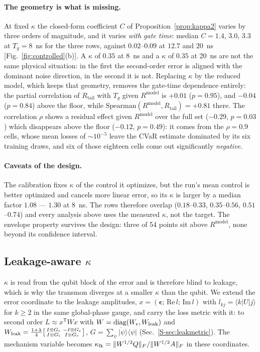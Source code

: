 \documentclass[aps,pra,twocolumn,superscriptaddress,reprint,nofootinbib,floatfix]{revtex4-2}
\theoremstyle{definition}
\newcommand{\Rt}{R_{\mathrm{tail}}}
\newcommand{\Rm}{R^{\mathrm{model}}}
\newcommand{\sref}[1]{Sec.~\ref{S-#1}}
\begin{document}
\paragraph*{The geometry is what is missing.} At fixed $\kappa$ the closed-form
coefficient $C$ of Proposition~\ref{prop:kappa2} varies by three orders of
magnitude, and it varies \emph{with gate time}: median $C=1.4$, $3.0$, $3.3$ at
$T_g=8$~ns for the three rows, against $0.02$--$0.09$ at $12.7$ and $20$~ns
[Fig.~\ref{fig:controlled}(b)]. A $\kappa$ of $0.35$ at 8~ns and a $\kappa$ of
$0.35$ at 20~ns are not the same physical situation: in the first the
second-order error is aligned with the dominant noise direction, in the second
it is not. Replacing $\kappa$ by the reduced model, which keeps that geometry,
removes the gate-time dependence entirely: the partial correlation of $\Rt$
with $T_g$ given $\Rm$ is $+0.01$ ($p=0.95$), and $-0.04$ ($p=0.84$) above the
floor, while $\mathrm{Spearman}(\Rm,\Rt)=+0.81$ there. The correlation
$\rho$ shows a residual effect given $\Rm$ over the full set ($-0.29$,
$p=0.03$) which disappears above the floor ($-0.12$, $p=0.49$): it comes from
the $\rho=0.9$ cells, whose mean losses of $\sim10^{-5}$ leave the CVaR
estimate dominated by its six training draws, and six of those eighteen cells
come out significantly \emph{negative}.

\paragraph*{Caveats of the design.} The calibration fixes $\kappa$ of the
control it optimizes, but the run's mean control is better optimized and
cancels more linear error, so its $\kappa$ is larger by a median factor
$1.08$ --- $1.30$ at 8~ns. The rows therefore overlap ($0.18$--$0.33$,
$0.35$--$0.56$, $0.51$--$0.74$) and every analysis above uses the measured
$\kappa$, not the target. The envelope property survives the design: three of
54 points sit above $\Rm$, none beyond its confidence interval.

\subsection{Leakage-aware $\kappa$}
\label{sec:leakage-kappa}

$\kappa$ is read from the qubit block of the error and is therefore blind to
leakage, which is why the transmon diverges at a smaller $\kappa$ than the
qubit. We extend the error coordinate to the leakage amplitudes,
$x=(\bm\epsilon;\,\mathrm{Re}\,l;\,\mathrm{Im}\,l)$ with
$l_{kj}=\langle k|U|j\rangle$ for $k\ge2$ in the same global-phase gauge, and
carry the loss metric with it: to second order
$L\approx x^{\mathsf T}Wx$ with $W=\mathrm{diag}(W_\epsilon,W_{\rm leak})$ and
$W_{\rm leak}=\tfrac{1+\lambda}{4}\big[\begin{smallmatrix}I\otimes G_r & -I\otimes G_i\\ I\otimes G_i & I\otimes G_r\end{smallmatrix}\big]$,
$G=\overline{\sum_\psi|\psi\rangle\langle\psi|}$ (\sref{sec:leakmetric}).
The mechanism variable becomes
$\kappa_{\rm lk}=\|W^{1/2}Q\|_F/\|W^{1/2}A\|_F$ in these coordinates.
\end{document}
